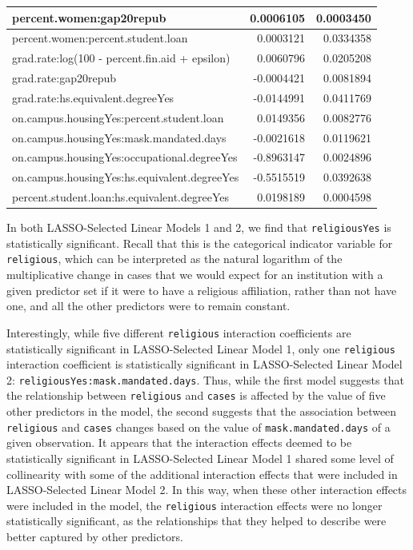 \documentclass[
]{article}
\begin{document}
\begin{table}
\begin{tabular}[t]{l|r|r}
\hline
percent.women:gap20repub & 0.0006105 & 0.0003450\\
\hline
percent.women:percent.student.loan & 0.0003121 & 0.0334358\\
\hline
grad.rate:log(100 - percent.fin.aid + epsilon) & 0.0060796 & 0.0205208\\
\hline
grad.rate:gap20repub & -0.0004421 & 0.0081894\\
\hline
grad.rate:hs.equivalent.degreeYes & -0.0144991 & 0.0411769\\
\hline
on.campus.housingYes:percent.student.loan & 0.0149356 & 0.0082776\\
\hline
on.campus.housingYes:mask.mandated.days & -0.0021618 & 0.0119621\\
\hline
on.campus.housingYes:occupational.degreeYes & -0.8963147 & 0.0024896\\
\hline
on.campus.housingYes:hs.equivalent.degreeYes & -0.5515519 & 0.0392638\\
\hline
percent.student.loan:hs.equivalent.degreeYes & 0.0198189 & 0.0004598\\
\hline
\end{tabular}
\end{table}

In both LASSO-Selected Linear Models 1 and 2, we find that
\texttt{religiousYes} is statistically significant. Recall that this is
the categorical indicator variable for \texttt{religious}, which can be
interpreted as the natural logarithm of the multiplicative change in
cases that we would expect for an institution with a given predictor set
if it were to have a religious affiliation, rather than not have one,
and all the other predictors were to remain constant.

Interestingly, while five different \texttt{religious} interaction
coefficients are statistically significant in LASSO-Selected Linear
Model 1, only one \texttt{religious} interaction coefficient is
statistically significant in LASSO-Selected Linear Model 2:
\texttt{religiousYes:mask.mandated.days}. Thus, while the first model
suggests that the relationship between \texttt{religious} and
\texttt{cases} is affected by the value of five other predictors in the
model, the second suggests that the association between
\texttt{religious} and \texttt{cases} changes based on the value of
\texttt{mask.mandated.days} of a given observation. It appears that the
interaction effects deemed to be statistically significant in
LASSO-Selected Linear Model 1 shared some level of collinearity with
some of the additional interaction effects that were included in
LASSO-Selected Linear Model 2. In this way, when these other interaction
effects were included in the model, the \texttt{religious} interaction
effects were no longer statistically significant, as the relationships
that they helped to describe were better captured by other predictors.
\end{document}
